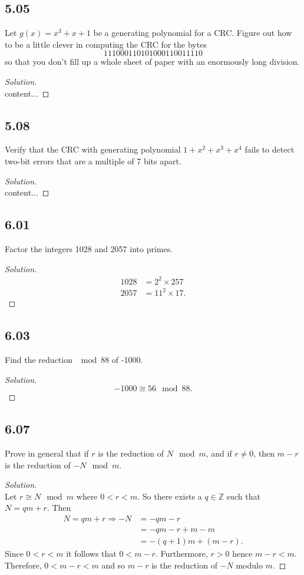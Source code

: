 \documentclass[]{article}
\newcommand\<{\langle}
\renewcommand\>{\rangle}
\newcommand{\ZZ}{\ensuremath{\mathbb{Z}}}
\newenvironment{solution}
{
	\begin{proof}[Solution] \text{ }
		\\
	}
	{
	\end{proof}
}
\begin{document}
\subsection*{5.05} Let $g(x) = x^3 + x + 1$ be a generating polynomial for a CRC. Figure out how to be a little clever in computing the CRC for the bytes
$$
	111000110101000110011110
$$
so that you don't fill up a whole sheet of paper with an enormously long division.
\begin{solution}
	content...
\end{solution}

\subsection*{5.08} Verify that the CRC with generating polynomial $1 + x^2 + x^3 + x^4$ fails to detect two-bit errors that are a multiple of 7 bits apart.
\begin{solution}
	content...
\end{solution}

\subsection*{6.01} Factor the integers 1028 and 2057 into primes.
\begin{solution}
	\begin{align*}
		1028 &= 2^2 \times 257 \\
		2057 &= 11^2 \times 17.
	\end{align*}
\end{solution}

\subsection*{6.03} Find the reduction $\mod 88$ of -1000.
\begin{solution}
	$$
		-1000 \cong 56 \mod 88.
	$$
\end{solution}

\subsection*{6.07} Prove in general that if $r$ is the reduction of $N \mod m$, and if $r \neq 0$, then $m - r$ is the reduction of $-N \mod m$.
\begin{solution}
	Let $r \cong N \mod m$ where $0 < r < m$. So there exists a $q \in \ZZ$ such that $N = qm + r$. Then
	\begin{align*}
		N = qm + r \Rightarrow -N &= -qm - r \\
		&= -qm - r + m - m \\
		&= -(q + 1)m + (m - r).
	\end{align*}
	Since $0 < r < m$ it follows that $0 < m - r$. Furthermore, $r > 0$ hence $m - r < m$. Therefore, $0 < m - r < m$ and so $m - r$ is the reduction of $-N$ modulo $m$.
\end{solution}
\end{document}
